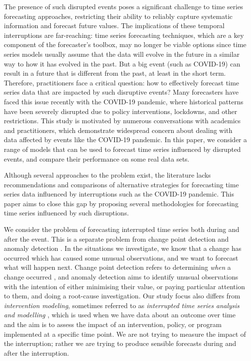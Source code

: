 \documentclass[
  11pt,
  a4paper,
]{article}
\begin{document}
The presence of such disrupted events poses a significant challenge to
time series forecasting approaches, restricting their ability to
reliably capture systematic information and forecast future values. The
implications of these temporal interruptions are far-reaching: time
series forecasting techniques, which are a key component of the
forecaster's toolbox, may no longer be viable options since time series
models usually assume that the data will evolve in the future in a
similar way to how it has evolved in the past. But a big event (such as
COVID-19) can result in a future that is different from the past, at
least in the short term. Therefore, practitioners face a critical
question: how to effectively forecast time series data that are impacted
by such disruptive events? Many forecasters have faced this issue
recently with the COVID-19 pandemic, where historical patterns have been
severely disrupted due to policy interventions, lockdowns, and other
restrictions. This study is motivated by numerous conversations with
academics and practitioners, which demonstrate widespread concern about
dealing with data affected by events like the COVID-19 pandemic. In this
paper, we consider a range of models that can be used to forecast time
series influenced by disrupted events, and compare their performance on
some real data sets.

Although several approaches to the problem exist, the literature lacks
recommendations and comparisons of alternative strategies for
forecasting time series data influenced by interruptions such as the
COVID-19 pandemic. This paper aims to close this gap by proposing
several methodologies for forecasting time series influenced by such
disruptions.

We consider the problem of forecasting interrupted time series both
during and after the event. This is a separate problem from change point
detection \autocite{aue2013structural,truong2020selective} and anomaly
detection \autocite{talagala2020anomaly}. In the situations we
investigate, we know that a change has occurred which has caused some
unusual observations, and we want to forecast what will happen next.
Change point detection refers to determining \emph{when} a change
occurred \autocite{blazquez2021review}, and anomaly detection aims to
identify unusual observations with the intention of either minimising
their value, or paying particular attention to them, and doing a
root-cause investigation. Our study focus also differs from
\emph{intervention modeling}, sometimes referred to as \emph{interrupted
time series analysis and modelling} \autocite{mcdowall2019interrupted},
which is used when we have data about an outcome over time and the aim
is to assess the impact of an intervention, policy, or program
implemented at a specific time point. We are not trying to measure the
impact of the interruption; rather we are trying to produce sensible
forecasts during and after the interruption.
\end{document}
